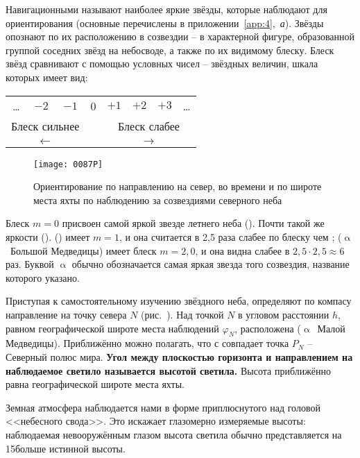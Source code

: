 Навигационными называют наиболее яркие звёзды, которые наблюдают для
ориентирования (основные перечислены в
приложении~\ref{app:4},~\textit{а}). Звёзды опознают по их
расположению в созвездии \--- в характерной фигуре, образованной
группой соседних звёзд на небосводе, а также по их видимому блеску.
Блеск звёзд сравнивают с помощью условных чисел \--- звёздных величин,
шкала которых имеет вид:

\begin{center}
  \small
  \begin{tabular}[c]{cccccccc}
    \ldots & $-2$ & $-1$ & 0 & $+1$ & $+2$ & $+3$ & \ldots \\
    \multicolumn{3}{c}{Блеск сильнее} & & \multicolumn{4}{c}{Блеск слабее} \\
    \multicolumn{3}{c}{$\longleftarrow$} & & \multicolumn{4}{c}{$\longrightarrow$} 
  \end{tabular}
\end{center}

\begin{figure*}[!htb]
  \centering{}
  \texttt{[image: 0087P]}
  \caption{Ориентирование по направлению на север, во времени и по
    широте места яхты по наблюдению за созвездиями северного неба}
  \label{fig:87}
\end{figure*}

Блеск $m=0$ присвоен самой яркой звезде летнего неба 
(). Почти такой же яркости 
().  () имеет
$m = 1$, и она считается в 2,5 раза слабее по блеску чем
;  ($\upalpha$~Большой Медведицы) имеет
блеск $m = 2,0$, и она видна слабее  в
$2,5 \cdot 2,5 \approx 6$ раз. Буквой $\upalpha$ обычно обозначается
самая яркая звезда того созвездия, название которого указано.

Приступая к самостоятельному изучению звёздного неба, определяют по
компасу направление на точку севера $N$ (рис.~). Над точкой
$N$ в угловом расстоянии $h$, равном географической широте места
наблюдений $\varphi_N$, расположена 
($\upalpha$~Малой Медведицы). Приближённо можно полагать, что с
 совпадает точка $P_N$ \--- Северный полюс
мира. \textbf{Угол между плоскостью горизонта и направлением на наблюдаемое
светило называется высотой светила.} Высота
 приближённо равна географической широте места
яхты.

Земная атмосфера наблюдается нами в форме приплюснутого над головой
<<небесного свода>>. Это искажает глазомерно измеряемые высоты:
наблюдаемая невооружённым глазом высота светила обычно представляется
на 15\gr больше истинной высоты.

